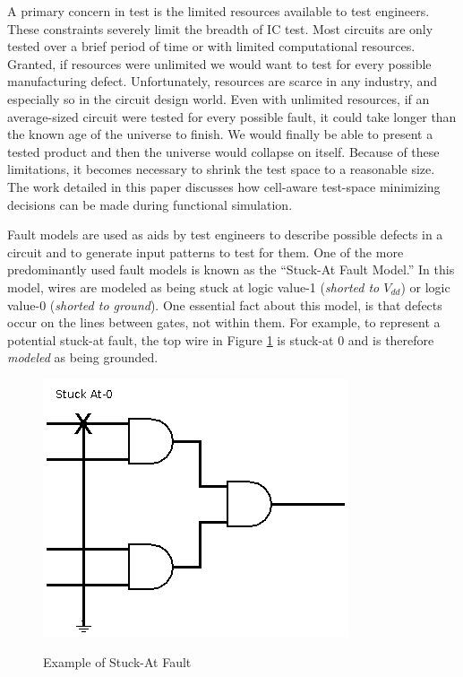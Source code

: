     A primary concern in test is the limited resources available to test engineers. 
    These constraints severely limit the breadth of IC test. 
    Most circuits are only tested over a brief period of time or with limited computational resources. 
    Granted, if resources were unlimited we would want to test for every possible manufacturing defect.
    Unfortunately, resources are scarce in any industry, and especially so in the circuit design world. 
    Even with unlimited resources, if an average-sized circuit were tested for every possible fault, it could take longer than the known age of the universe to finish. 
    We would finally be able to present a tested product and then the universe would collapse on itself. 
    Because of these limitations, it becomes necessary to shrink the test space to a reasonable size. 
    The work detailed in this paper discusses how cell-aware test-space minimizing decisions can be made during functional simulation.


    Fault models are used as aids by test engineers to describe possible defects in a circuit and to generate input patterns to test for them. 
    One of the more predominantly used fault models is known as the ``Stuck-At Fault Model.''
    In this model, wires are modeled as being stuck at logic value-1 (\textit{shorted to $V_{dd}$}) or logic value-0 (\textit{shorted to ground}).
    One essential fact about this model, is that defects occur on the lines between gates,  not within them. 
    For example, to represent a potential stuck-at fault, the top wire in Figure \ref{fig:safault} is stuck-at 0 and is therefore \textit{modeled} as being grounded.

    \begin{figure}[h!]
        \begin{center}
            \caption{Example of Stuck-At Fault}
            \includegraphics[scale=0.5]{Figures/sa0.png}
            \label{fig:safault}
        \end{center}
    \end{figure}

